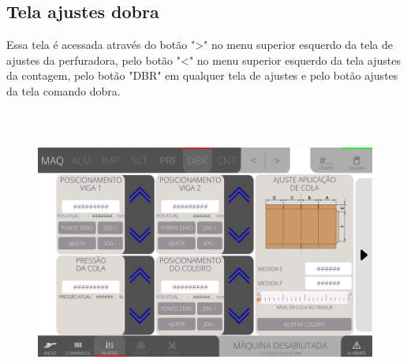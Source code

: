 \thispagestyle{fancy}
\vspace*{40 pt}
\subsection{Tela ajustes dobra}\label{telaAjustesDobra}
Essa tela é acessada através do botão "\textgreater" no menu superior esquerdo da tela de ajustes da perfuradora, pelo botão "\textless{}" no menu superior esquerdo
da tela ajustes da contagem, pelo botão "DBR" em qualquer tela de ajustes e pelo botão ajustes da tela comando dobra.
\vspace*{\fill}
\begin{figure}[h]
  \centering
  \includegraphics[width=576px,height=360px]{src/imagesFlexo/07-fold/settings/e-Tela-Principal.png}
\end{figure}
\vspace*{\fill}

\newpage
\thispagestyle{fancy}
\vspace*{40 pt}

